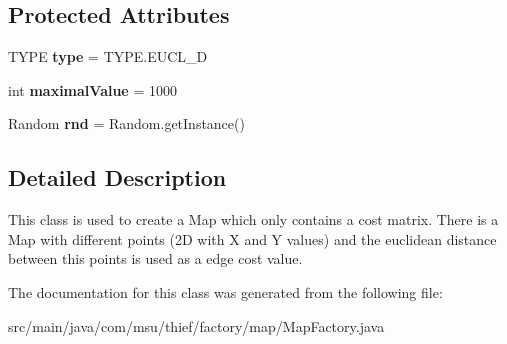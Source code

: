 \subsection*{Protected Attributes}
\begin{DoxyCompactItemize}
\item 
\hypertarget{classcom_1_1msu_1_1thief_1_1factory_1_1map_1_1MapFactory_a12458983d91830827e50c905eab68f28}{T\-Y\-P\-E {\bfseries type} = T\-Y\-P\-E.\-E\-U\-C\-L\-\_\-D}\label{classcom_1_1msu_1_1thief_1_1factory_1_1map_1_1MapFactory_a12458983d91830827e50c905eab68f28}

\item 
\hypertarget{classcom_1_1msu_1_1thief_1_1factory_1_1map_1_1MapFactory_ac7309f2672343f79be446d8cfedb31aa}{int {\bfseries maximal\-Value} = 1000}\label{classcom_1_1msu_1_1thief_1_1factory_1_1map_1_1MapFactory_ac7309f2672343f79be446d8cfedb31aa}

\item 
\hypertarget{classcom_1_1msu_1_1thief_1_1factory_1_1map_1_1MapFactory_aa8c6ddd8ed78d65d2870819e6b7b96f3}{Random {\bfseries rnd} = Random.\-get\-Instance()}\label{classcom_1_1msu_1_1thief_1_1factory_1_1map_1_1MapFactory_aa8c6ddd8ed78d65d2870819e6b7b96f3}

\end{DoxyCompactItemize}


\subsection{Detailed Description}
This class is used to create a Map which only contains a cost matrix. There is a Map with different points (2\-D with X and Y values) and the euclidean distance between this points is used as a edge cost value. 

The documentation for this class was generated from the following file\-:\begin{DoxyCompactItemize}
\item 
src/main/java/com/msu/thief/factory/map/Map\-Factory.\-java\end{DoxyCompactItemize}
